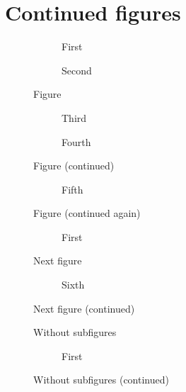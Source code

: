 \documentclass{article}
\newcommand\SCLsub[3][]{%
  \begin{subfigure}{.3\linewidth}
    \centering\SCLimage{2cm}{1cm}
    \caption{#2}#3%
  \end{subfigure}\hfill}
\begin{document}
\section*{Continued figures}

\begin{figure}[htbp]
  \centering
  \SCLsub{First}{}
  \SCLsub{Second}{}
  \caption{Figure}\label{fig:first}
\end{figure}

\begin{figure}[htbp]
  \ContinuedFloat
  \centering
  \SCLsub{Third}{\label{fig:first-c}}
  \SCLsub{Fourth}{}
  \caption{Figure (continued)}%
  \label{fig:first-cont}
\end{figure}

\begin{figure}[htbp]
  \ContinuedFloat
  \centering
  \SCLsub{Fifth}{}
  \caption{Figure (continued again)}
\end{figure}

\begin{figure}[htbp]
  \centering
  \SCLsub{First}{}
  \caption{Next figure}
\end{figure}

\begin{figure}[htbp]
  \ContinuedFloat
  \setcounter{subfigure}{5}%
  \centering
  \SCLsub{Sixth}{}
  \caption{Next figure (continued)}
\end{figure}

\begin{figure}[htbp]
  \centering
  \SCLimage{2cm}{1cm}
  \caption{Without subfigures}
\end{figure}

\begin{figure}[htbp]
  \ContinuedFloat
  \centering
  \SCLsub{First}{}
  \caption{Without subfigures (continued)}
\end{figure}
\end{document}
